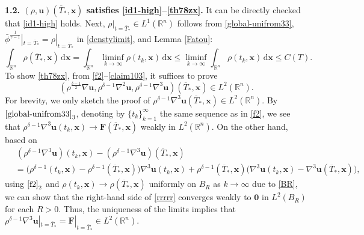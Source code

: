 \documentclass[11pt,reqno]{amsart}
\numberwithin{rk}{section}
\numberwithin{prop}{section}
\numberwithin{mydef}{section}
\numberwithin{lem}{section}
\numberwithin{equation}{section}
\numberwithin{thm}{section}
\begin{document}
\smallskip
\textbf{1.2. $(\rho,\boldsymbol{u})(\overline{T}_*,\boldsymbol{x})$ satisfies \eqref{id1-high}--\eqref{th78zx}.} It can be directly checked that \eqref{id1-high} holds. Next, $\rho|_{t=\overline{T}_*}\in L^1(\mathbb{R}^n)$ follows from \eqref{global-unifrom33}, $\bar\phi^\frac{1}{\gamma-1}|_{t=\overline{T}_*}= \rho|_{t=\overline{T}_*}$ in \eqref{denstylimit}, and Lemma \ref{Fatou}:
\begin{equation*}
\int_{\mathbb{R}^n} \rho(\overline{T}_*,\boldsymbol{x})\,\mathrm{d}\boldsymbol{x}=\int_{\mathbb{R}^n} \liminf_{k\to\infty}\rho(t_{k},\boldsymbol{x})\,\mathrm{d}\boldsymbol{x}\le \liminf_{k\to\infty}\int_{\mathbb{R}^n} \rho(t_{k},\boldsymbol{x})\,\mathrm{d}\boldsymbol{x}\leq C(T).
\end{equation*} 
To show \eqref{th78zx}, from \eqref{f2}--\eqref{claim103}, it suffices to prove 
\begin{equation}
(\rho^\frac{\delta-1}{2} \nabla\boldsymbol{u},\rho^{\delta-1} \nabla^2\boldsymbol{u}, \rho^{\delta-1}\nabla^3\boldsymbol{u})(\overline{T}_*,\boldsymbol{x})\in L^{2}(\mathbb{R}^n).
\end{equation}
For brevity, we only sketch the proof of $\rho^{\delta-1}\nabla^3\boldsymbol{u} (\overline{T}_*,\boldsymbol{x})\in L^{2}(\mathbb{R}^n)$. By $\eqref{global-unifrom33}_3$, denoting by $\{t_k\}_{k=1}^\infty$ the same sequence as in \eqref{f2}, we see that $\rho^{\delta-1}\nabla^3\boldsymbol{u}(t_{k},\boldsymbol{x})\to  \boldsymbol{F}(\overline{T}_*,\boldsymbol{x})$ weakly in  $L^2(\mathbb{R}^n)$. On the other hand, based on
\begin{equation}\label{rrrrr}
\begin{aligned}
&\,(\rho^{\delta-1}\nabla^3\boldsymbol{u})(t_{k},\boldsymbol{x})-(\rho^{\delta-1}\nabla^3\boldsymbol{u})(\overline{T}_*,\boldsymbol{x})\\
&=\big(\rho^{\delta-1}(t_{k},\boldsymbol{x})-\rho^{\delta-1}(\overline{T}_*,\boldsymbol{x})\big)\nabla^3\boldsymbol{u}(t_k,\boldsymbol{x})+  \rho^{\delta-1}(\overline{T}_*,\boldsymbol{x})\big(\nabla^3\boldsymbol{u}(t_{k},\boldsymbol{x})-\nabla^3\boldsymbol{u}(\overline{T}_*,\boldsymbol{x})\big),    
\end{aligned}
\end{equation}
using $\eqref{f2}_2$ and  $\rho (t_k,\boldsymbol{x})\to \rho(\overline{T}_*,\boldsymbol{x})$ uniformly on $B_R$ as $k\to\infty$ due to \eqref{BR}, we can show that the right-hand side of \eqref{rrrrr} converges weakly to $\boldsymbol{0}$  in $L^2(B_R)$ for each $R>0$. Thus, the uniqueness of the limits implies that $\rho^{\delta-1}\nabla^3\boldsymbol{u}|_{t=\overline{T}_*}=\boldsymbol{F}|_{t=\overline{T}_*}\in L^2(\mathbb{R}^n)$. 
 
\end{document}
